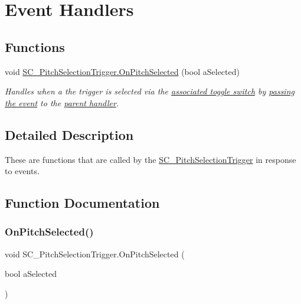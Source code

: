 \hypertarget{group___s_c___p_s_t_handlers}{}\section{Event Handlers}
\label{group___s_c___p_s_t_handlers}
\subsection*{Functions}
\begin{DoxyCompactItemize}
\item 
void \hyperlink{group___s_c___p_s_t_handlers_ga5f4ea69eee3ed20cb09d56b7281ce861}{S\+C\+\_\+\+Pitch\+Selection\+Trigger.\+On\+Pitch\+Selected} (bool a\+Selected)
\begin{DoxyCompactList}\small\item\em Handles when a the trigger is selected via the \hyperlink{group___s_c___p_s_t_priv_var_ga1ecd33f50c82f6ffda81850438907a31}{associated toggle switch} by \hyperlink{group___s_c___p_s_c_handlers_gaa2afa8167100515d412cf751d9334f0c}{passing the event} to the \hyperlink{group___doc_s_c___p_s_c}{parent handler}. \end{DoxyCompactList}\end{DoxyCompactItemize}


\subsection{Detailed Description}
These are functions that are called by the \hyperlink{class_s_c___pitch_selection_trigger}{S\+C\+\_\+\+Pitch\+Selection\+Trigger} in response to events. 

\subsection{Function Documentation}
\mbox{\label{group___s_c___p_s_t_handlers_ga5f4ea69eee3ed20cb09d56b7281ce861}} 
\subsubsection{\texorpdfstring{On\+Pitch\+Selected()}{OnPitchSelected()}}
{\footnotesize\ttfamily void S\+C\+\_\+\+Pitch\+Selection\+Trigger.\+On\+Pitch\+Selected (\begin{DoxyParamCaption}\item[{bool}]{a\+Selected }\end{DoxyParamCaption})}



